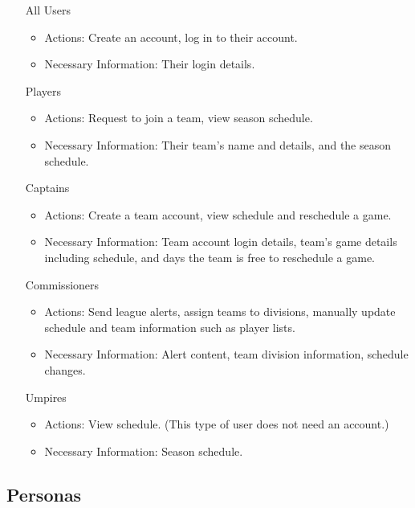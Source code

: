 \documentclass[12pt]{article}
\begin{document}
\begin{itemize}
  \item [All Users]
  \begin{itemize}
    \item Actions: Create an account, log in to their account.
    \item Necessary Information: Their login details.
  \end{itemize}
  \item [Players]
  \begin{itemize}
    \item Actions: Request to join a team, view season schedule.
    \item Necessary Information: Their team's name and details, and the season
    schedule.
  \end{itemize}
  \item [Captains]
  \begin{itemize}
    \item Actions: Create a team account, view schedule and reschedule a game.
    \item Necessary Information: Team account login details, team's game
    details including schedule, and days the team is free to reschedule a
    game.
  \end{itemize}
  \item [Commissioners]
  \begin{itemize}
    \item Actions: Send league alerts, assign teams to divisions, manually
    update schedule and team information such as player lists.
    \item Necessary Information: Alert content, team division information,
    schedule changes.
  \end{itemize}
  \item [Umpires]
  \begin{itemize}
    \item Actions: View schedule. (This type of user does not need an
    account.)
    \item Necessary Information: Season schedule.
  \end{itemize}
\end{itemize}

\subsection{Personas}
\end{document}
